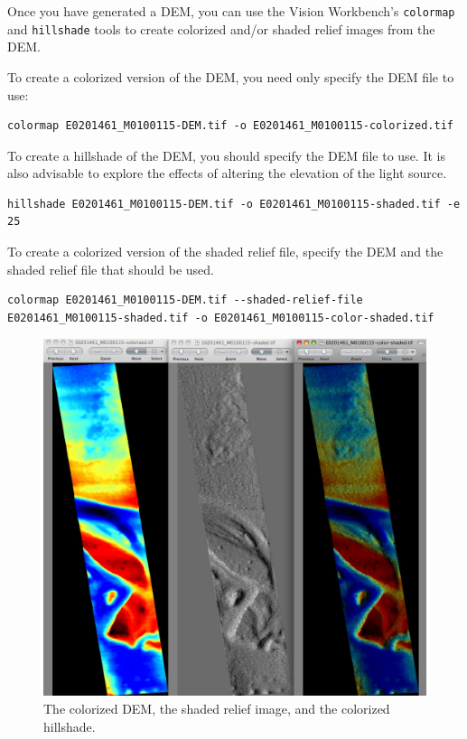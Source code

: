 Once you have generated a DEM, you can use the Vision Workbench's
\texttt{colormap} and \texttt{hillshade} tools to create colorized
and/or shaded relief images from the DEM.

To create a colorized version of the DEM, you need only specify the
DEM file to use:

\begin{verbatim}
colormap E0201461_M0100115-DEM.tif -o E0201461_M0100115-colorized.tif
\end{verbatim}

To create a hillshade of the DEM, you should specify the DEM file
to use. It is also advisable to explore the effects of altering the
elevation of the light source.

\begin{verbatim}
hillshade E0201461_M0100115-DEM.tif -o E0201461_M0100115-shaded.tif -e 25
\end{verbatim}

To create a colorized version of the shaded relief file, specify
the DEM and the shaded relief file that should be used.

\begin{verbatim}
colormap E0201461_M0100115-DEM.tif --shaded-relief-file E0201461_M0100115-shaded.tif -o E0201461_M0100115-color-shaded.tif
\end{verbatim}

\begin{figure}
\begin{center}
\includegraphics[width=5in]{images/p19-colorized-shaded.png}
\caption[P19 colorized and shaded relief]{
    \label{p19-color}
	The colorized DEM, the shaded relief image, and the colorized hillshade.
    }
\end{center}
\end{figure}

